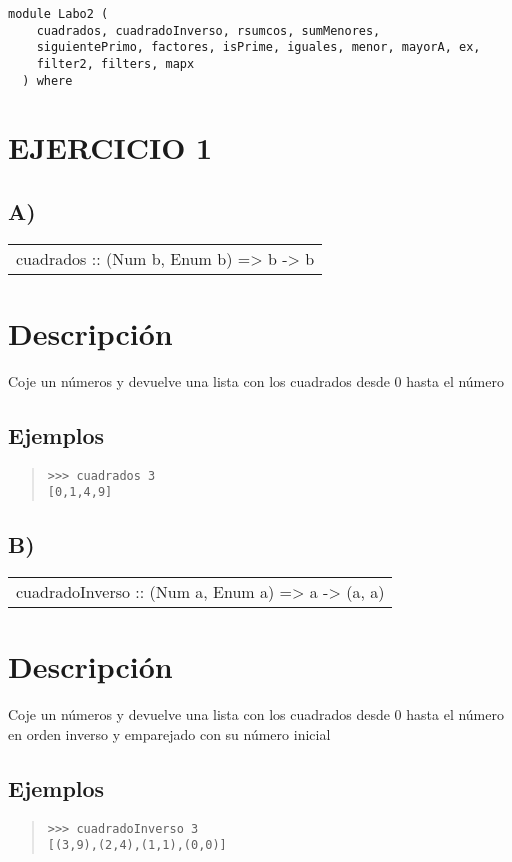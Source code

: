 \label{module:Labo2}
\haddockbeginheader
{\haddockverb\begin{verbatim}
module Labo2 (
    cuadrados, cuadradoInverso, rsumcos, sumMenores,
    siguientePrimo, factores, isPrime, iguales, menor, mayorA, ex,
    filter2, filters, mapx
  ) where\end{verbatim}}
\haddockendheader

\section{EJERCICIO 1}
\subsection{A)}
\begin{haddockdesc}
\item[\begin{tabular}{@{}l}
cuadrados :: (Num b, Enum b) => b -> {\char 91}b{\char 93}
\end{tabular}]
{\haddockbegindoc
\section*{Descripción}
Coje un números y devuelve una lista con los cuadrados desde 0 hasta el número\par
\subsection*{Ejemplos}
\begin{quote}
{\haddockverb\begin{verbatim}
>>> cuadrados 3
[0,1,4,9]

\end{verbatim}}
\end{quote}}
\end{haddockdesc}
\subsection{B)}
\begin{haddockdesc}
\item[\begin{tabular}{@{}l}
cuadradoInverso :: (Num a, Enum a) => a -> {\char 91}(a, a){\char 93}
\end{tabular}]
{\haddockbegindoc
\section*{Descripción}
Coje un números y devuelve una lista con los cuadrados desde 0 hasta el número en orden inverso y emparejado con su número inicial\par
\subsection*{Ejemplos}
\begin{quote}
{\haddockverb\begin{verbatim}
>>> cuadradoInverso 3
[(3,9),(2,4),(1,1),(0,0)]

\end{verbatim}}
\end{quote}}
\end{haddockdesc}
